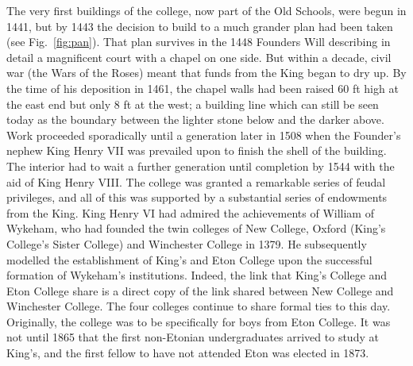 \documentclass{report}
\begin{document}
The very first buildings of the college, now part of the Old Schools, were begun in 1441, but by 1443 the decision to build to a much grander plan had been taken (see Fig.~\ref{fig:pan}). That plan survives in the 1448 Founders Will describing in detail a magnificent court with a chapel on one side. But within a decade, civil war (the Wars of the Roses) meant that funds from the King began to dry up. By the time of his deposition in 1461, the chapel walls had been raised 60 ft high at the east end but only 8 ft at the west; a building line which can still be seen today as the boundary between the lighter stone below and the darker above. Work proceeded sporadically until a generation later in 1508 when the Founder's nephew King Henry VII was prevailed upon to finish the shell of the building. The interior had to wait a further generation until completion by 1544 with the aid of King Henry VIII. The college was granted a remarkable series of feudal privileges, and all of this was supported by a substantial series of endowments from the King. King Henry VI had admired the achievements of William of Wykeham, who had founded the twin colleges of New College, Oxford (King's College's Sister College) and Winchester College in 1379. He subsequently modelled the establishment of King's and Eton College upon the successful formation of Wykeham's institutions. Indeed, the link that King's College and Eton College share is a direct copy of the link shared between New College and Winchester College. The four colleges continue to share formal ties to this day. Originally, the college was to be specifically for boys from Eton College. It was not until 1865 that the first non-Etonian undergraduates arrived to study at King's, and the first fellow to have not attended Eton was elected in 1873. \\

\newpage


% 
\end{document}
